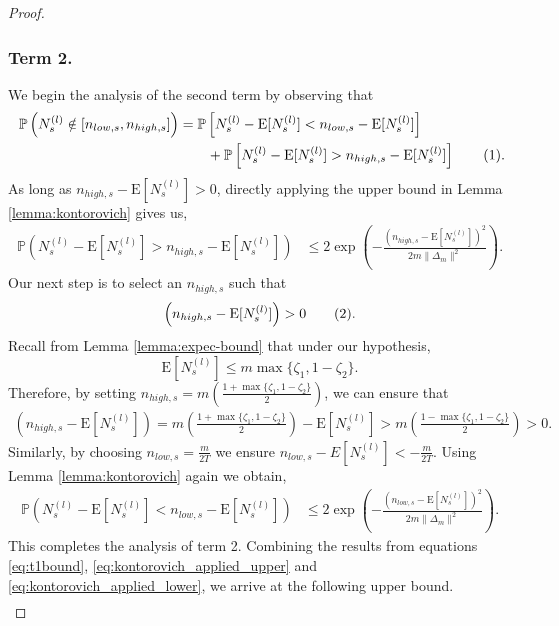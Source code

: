 \documentclass[opre,sglanonrev]{informs4}
\numberwithin{equation}{section}
\newcommand{\lp}{\left(}
\newcommand{\rp}{\right)}
\newcommand{\E}{\mathrm{E}}
\newcommand{\Pbb}{\mathbb{P}}
\newcommand\numberthis{\addtocounter{equation}{1}\tag{\theequation}}
\newcommand{\prob}{\Pbb}
\begin{document}
\begin{APPENDICES}
\begin{proof}
\subsubsection*{Term 2.}
We begin the analysis of the second term by observing that
\begin{align*}~\label{eq:p1term2}
    \prob\left(N_s^{(l)}\notin [n_{low,s} ,n_{high,s}]\right) & = \prob\left[N_s^{(l)}-\E[N_s^{(l)}]<n_{low,s}-\E[N_s^{(l)}]\right]\\
    & \qquad + \prob\left[N_s^{(l)}-\E[N_s^{(l)}]>n_{high,s}-\E[N_s^{(l)}]\right]\numberthis.
\end{align*}
As long as $n_{high,s}-\E[N_s^{(l)}]>0$, directly applying the upper bound in Lemma \ref{lemma:kontorovich} gives us,
\begin{align}\label{eq:kontorovich_applied_upper}
    \prob \left(N_s^{(l)}-\E[N_s^{(l)}]>n_{high,s}-\E[N_s^{(l)}] \right) & \leq 2\exp\left(-{\frac{\left(n_{high,s}-\E\left[N_s^{(l)}\right] \right)^2}{2m\|\Delta_{m}\|^2}}\right).
\end{align}
Our next step is to select an $n_{high,s}$ such that
\begin{align*}
\left(n_{high,s}-\E[N_s^{(l)}] \right)>0\numberthis\label{eq:main-thmeq5}.    
\end{align*}
Recall from Lemma \ref{lemma:expec-bound} that under our hypothesis,
\[
\E\left[ N_s^{(l)} \right] \leq m \max\{ \zeta_1, 1-\zeta_2\}.
\]
Therefore, by setting $n_{high,s} = m\lp\frac{1+\max\{\zeta_1,1-\zeta_2\}}{2}\rp$, we can ensure that  
\begin{align*}
   \left(n_{high,s}-\E[N_s^{(l)}]\right) =m\lp\frac{1+\max\{\zeta_1,1-\zeta_2\}}{2}\rp-\E\left[ N_s^{(l)} \right] > m\lp\frac{1-\max\{\zeta_1,1-\zeta_2\}}{2}\rp>0. 
\end{align*}
Similarly, by choosing $n_{low,s}=\frac{m}{2T}$ we ensure $n_{low,s} - E\left[ N_{s}^{(l)}\right] < -\frac{m}{2T}$.
Using Lemma \ref{lemma:kontorovich} again we obtain,
\begin{align}\label{eq:kontorovich_applied_lower}
    \prob \left(N_s^{(l)}-\E[N_s^{(l)}]<n_{low,s}-\E[N_s^{(l)}] \right) & \leq 2\exp\left(-{\frac{\left(n_{low,s}-\E\left[N_s^{(l)}\right] \right)^2}{2m\|\Delta_{m}\|^2}}\right).
\end{align}
This completes the analysis of term 2.
\noindent Combining the results from equations \ref{eq:t1bound}, \ref{eq:kontorovich_applied_upper} and  \ref{eq:kontorovich_applied_lower}, we arrive at the following upper bound. 
\begin{align*}

\end{align*}
\end{proof}
\end{APPENDICES}
\end{document}
